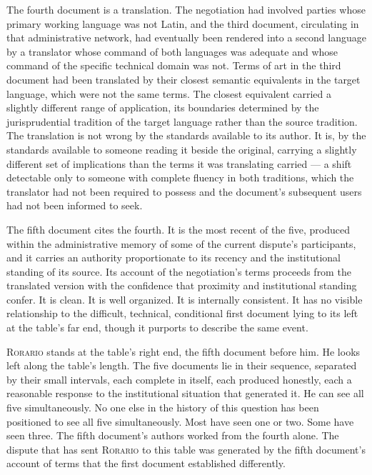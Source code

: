 \documentclass[12pt, oneside]{article}
\newenvironment{action}{%
  \vspace{0.6em}%
  \noindent\ignorespaces%
}{%
  \par\vspace{0.6em}%
}
\begin{document}
\begin{action}
The fourth document is a translation. The negotiation had involved parties whose primary working language was not Latin, and the third document, circulating in that administrative network, had eventually been rendered into a second language by a translator whose command of both languages was adequate and whose command of the specific technical domain was not. Terms of art in the third document had been translated by their closest semantic equivalents in the target language, which were not the same terms. The closest equivalent carried a slightly different range of application, its boundaries determined by the jurisprudential tradition of the target language rather than the source tradition. The translation is not wrong by the standards available to its author. It is, by the standards available to someone reading it beside the original, carrying a slightly different set of implications than the terms it was translating carried --- a shift detectable only to someone with complete fluency in both traditions, which the translator had not been required to possess and the document's subsequent users had not been informed to seek.

The fifth document cites the fourth. It is the most recent of the five, produced within the administrative memory of some of the current dispute's participants, and it carries an authority proportionate to its recency and the institutional standing of its source. Its account of the negotiation's terms proceeds from the translated version with the confidence that proximity and institutional standing confer. It is clean. It is well organized. It is internally consistent. It has no visible relationship to the difficult, technical, conditional first document lying to its left at the table's far end, though it purports to describe the same event.

\textsc{Rorario} stands at the table's right end, the fifth document before him. He looks left along the table's length. The five documents lie in their sequence, separated by their small intervals, each complete in itself, each produced honestly, each a reasonable response to the institutional situation that generated it. He can see all five simultaneously. No one else in the history of this question has been positioned to see all five simultaneously. Most have seen one or two. Some have seen three. The fifth document's authors worked from the fourth alone. The dispute that has sent \textsc{Rorario} to this table was generated by the fifth document's account of terms that the first document established differently.
\end{action}
\end{document}

